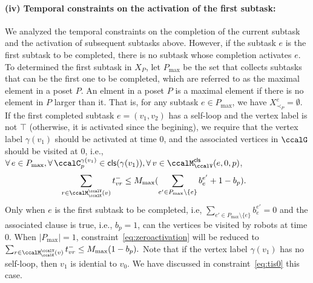 \documentclass[Afour,sageh,times]{sagej}
\newcommand{\clause}[1]{\mathsf{cls}(#1)}
\begin{document}
{{{%

\paragraph{(iv) Temporal constraints on the activation of the first subtask:}
We analyzed the temporal constraints on the completion of the current subtask and the activation of subsequent subtasks above. However, if the subtask $e$ is the first subtask to be completed, there is no subtask whose completion activates $e$. To determined the first subtask in $X_P$,  let $P_{\text{max}}$ be the set that collects subtasks that can be the first one to be completed, which are referred to as the maximal element in a poset $P$. An elment in a poset $P$ is a maximal element if there is no element in $P$ larger than it. That is, for  any subtask  $e \in P_{\text{max}}$, we have $X_{\prec_P}^e = \emptyset$. If the first completed subtask $e = (v_1 ,v_2)$ has a self-loop and the vertex label is not $\top$ (otherwise, it is activated since the begining), we require that the vertex label $\gamma(v_1)$ should be activated at time 0, and the associated vertices in $\ccalG$ should be visited at 0,   i.e., $\forall\, e \in P_{\text{max}}, \forall\, \ccalC_p^{\gamma(v_1)} \in \clause{\gamma(v_1)}, \forall \,v \in \ccalM^\mathsf{cls}_\ccalV(e,0,p)$,
\begingroup\makeatletter\def\f@size{10}\check@mathfonts
\def\maketag@@@#1{\hbox{\m@th\normalsize\normalfont#1}}%
\begin{align}\label{eq:zeroactivation}
  & \sum_{r\in \ccalM^\ccalV_{\ccalK}(v)} t_{vr}^-  \leq M_{\text{max}} (\sum_{e' \in P_{\text{max}}\setminus \{e\}  } {b}_{e}^{e'} + 1- b_p).
\end{align}
\endgroup
Only when $e$ is the first subtask to be completed, i.e, $\sum_{e' \in P_{\text{max}}\setminus \{e\}  } {b}_{e}^{e'}=0$ and the associated clause is true, i.e., $b_p=1$, can the vertices be visited by robots at time 0. When $|P_{\text{max}}|=1$, constraint~\eqref{eq:zeroactivation} will be reduced to  $ \sum_{r\in \ccalM^\ccalV_{\ccalK}(v)} t_{vr}^-  \leq M_{\text{max}} (1- b_p).$ Note that if the vertex label $\gamma(v_1)$ has no self-loop, then $v_1$ is idential to $v_0$. We have discussed in constraint~\eqref{eq:tis0} this case.


}}}
\end{document}
